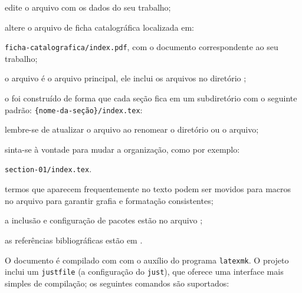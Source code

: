 \begin{alineas}
  \item edite o arquivo  \metadatafile{} com os dados do seu trabalho;

  \item altere o arquivo de ficha catalográfica localizada em:

  \contentdir{}\texttt{ficha-catalografica/index.pdf}, com o documento correspondente ao seu trabalho;

  \item o arquivo \mainfile{} é o arquivo principal, ele inclui os arquivos no diretório \contentdir;

  \item o \template{} foi construído de forma que cada seção fica em um subdiretório com o seguinte padrão: \contentdir{}\texttt{\{nome-da-seção\}/index.tex}:

  \begin{alineas}
    \item lembre-se de atualizar o arquivo \mainfile{} ao renomear o diretório ou o arquivo;

    \item sinta-se à vontade para mudar a organização, como por exemplo:

    \contentdir{}\texttt{section-01/index.tex}.
  \end{alineas}

  \item termos que aparecem frequentemente no texto podem ser movidos para macros no arquivo \macrofile{} para garantir grafia e formatação consistentes;

  \item a inclusão e configuração de pacotes estão no arquivo \pkgfile;

  \item as referências bibliográficas estão em \bibfile.
\end{alineas}

O documento é compilado com \XeLaTeX{} com o auxílio do programa \texttt{latexmk}. O projeto inclui um \texttt{justfile} (a configuração do \texttt{just}), que oferece uma interface mais simples de compilação; os seguintes comandos são suportados:

